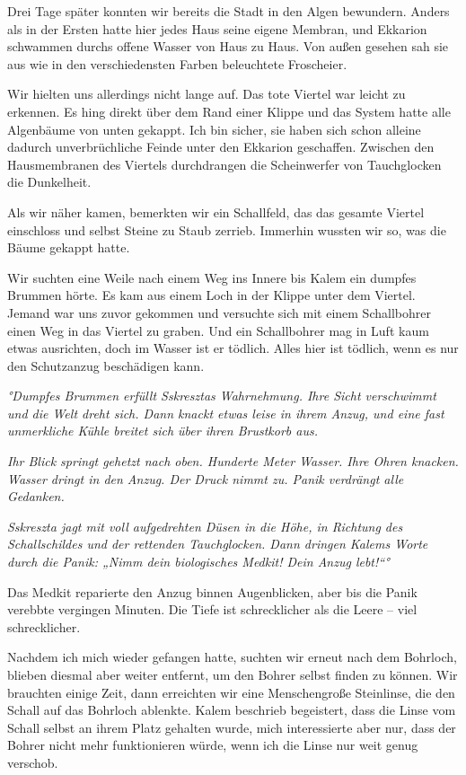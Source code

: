 \documentclass[11pt]{article}
\begin{document}
Drei Tage später konnten wir bereits die Stadt in den Algen bewundern.
Anders als in der Ersten hatte hier jedes Haus seine eigene Membran, und
Ekkarion schwammen durchs offene Wasser von Haus zu Haus. Von außen
gesehen sah sie aus wie in den verschiedensten Farben beleuchtete
Froscheier.

Wir hielten uns allerdings nicht lange auf. Das tote Viertel war leicht
zu erkennen. Es hing direkt über dem Rand einer Klippe und das System
hatte alle Algenbäume von unten gekappt. Ich bin sicher, sie haben sich
schon alleine dadurch unverbrüchliche Feinde unter den Ekkarion
geschaffen. Zwischen den Hausmembranen des Viertels durchdrangen die
Scheinwerfer von Tauchglocken die Dunkelheit.

Als wir näher kamen, bemerkten wir ein Schallfeld, das das gesamte
Viertel einschloss und selbst Steine zu Staub zerrieb. Immerhin wussten
wir so, was die Bäume gekappt hatte.

Wir suchten eine Weile nach einem Weg ins Innere bis Kalem ein dumpfes
Brummen hörte. Es kam aus einem Loch in der Klippe unter dem Viertel.
Jemand war uns zuvor gekommen und versuchte sich mit einem Schallbohrer
einen Weg in das Viertel zu graben. Und ein Schallbohrer mag in Luft
kaum etwas ausrichten, doch im Wasser ist er tödlich. Alles hier ist
tödlich, wenn es nur den Schutzanzug beschädigen kann.

\emph{°Dumpfes Brummen erfüllt Sskresztas Wahrnehmung. Ihre Sicht
verschwimmt und die Welt dreht sich. Dann knackt etwas leise in ihrem
Anzug, und eine fast unmerkliche Kühle breitet sich über ihren Brustkorb
aus.}

\emph{Ihr Blick springt gehetzt nach oben. Hunderte Meter Wasser. Ihre
Ohren knacken. Wasser dringt in den Anzug. Der Druck nimmt zu. Panik
verdrängt alle Gedanken.}

\emph{Sskreszta jagt mit voll aufgedrehten Düsen in die Höhe, in
Richtung des Schallschildes und der rettenden Tauchglocken. Dann dringen
Kalems Worte durch die Panik: „Nimm dein biologisches Medkit! Dein Anzug
lebt!``°}

Das Medkit reparierte den Anzug binnen Augenblicken, aber bis die Panik
verebbte vergingen Minuten. Die Tiefe ist schrecklicher als die Leere --
viel schrecklicher.

Nachdem ich mich wieder gefangen hatte, suchten wir erneut nach dem
Bohrloch, blieben diesmal aber weiter entfernt, um den Bohrer selbst
finden zu können. Wir brauchten einige Zeit, dann erreichten wir eine
Menschengroße Steinlinse, die den Schall auf das Bohrloch ablenkte.
Kalem beschrieb begeistert, dass die Linse vom Schall selbst an ihrem
Platz gehalten wurde, mich interessierte aber nur, dass der Bohrer nicht
mehr funktionieren würde, wenn ich die Linse nur weit genug verschob.
\end{document}
